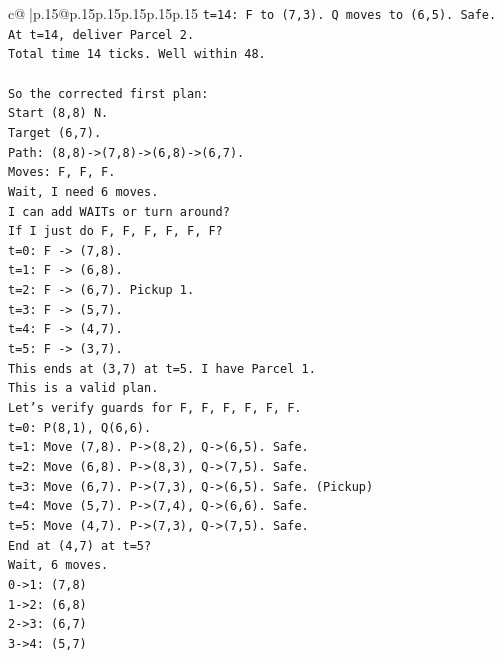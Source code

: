 \documentclass{article}
\begin{document}
{\begin{supertabular}{c@{$\;$}|p{.15\linewidth}@{}p{.15\linewidth}p{.15\linewidth}p{.15\linewidth}p{.15\linewidth}p{.15\linewidth}}
{{{\texttt{t=14: F to (7,3). Q moves to (6,5). Safe.} \\
\texttt{At t=14, deliver Parcel 2.} \\
\texttt{Total time 14 ticks. Well within 48.} \\
\\ 
\texttt{So the corrected first plan:} \\
\texttt{Start (8,8) N.} \\
\texttt{Target (6,7).} \\
\texttt{Path: (8,8){-}>(7,8){-}>(6,8){-}>(6,7).} \\
\texttt{Moves: F, F, F.} \\
\texttt{Wait, I need 6 moves.} \\
\texttt{I can add WAITs or turn around?} \\
\texttt{If I just do F, F, F, F, F, F?} \\
\texttt{t=0: F {-}> (7,8).} \\
\texttt{t=1: F {-}> (6,8).} \\
\texttt{t=2: F {-}> (6,7). Pickup 1.} \\
\texttt{t=3: F {-}> (5,7).} \\
\texttt{t=4: F {-}> (4,7).} \\
\texttt{t=5: F {-}> (3,7).} \\
\texttt{This ends at (3,7) at t=5. I have Parcel 1.} \\
\texttt{This is a valid plan.} \\
\texttt{Let's verify guards for F, F, F, F, F, F.} \\
\texttt{t=0: P(8,1), Q(6,6).} \\
\texttt{t=1: Move (7,8). P{-}>(8,2), Q{-}>(6,5). Safe.} \\
\texttt{t=2: Move (6,8). P{-}>(8,3), Q{-}>(7,5). Safe.} \\
\texttt{t=3: Move (6,7). P{-}>(7,3), Q{-}>(6,5). Safe. (Pickup)} \\
\texttt{t=4: Move (5,7). P{-}>(7,4), Q{-}>(6,6). Safe.} \\
\texttt{t=5: Move (4,7). P{-}>(7,3), Q{-}>(7,5). Safe.} \\
\texttt{End at (4,7) at t=5?} \\
\texttt{Wait, 6 moves.} \\
\texttt{0{-}>1: (7,8)} \\
\texttt{1{-}>2: (6,8)} \\
\texttt{2{-}>3: (6,7)} \\
\texttt{3{-}>4: (5,7)} \\
}}}
\end{supertabular}}
\end{document}
